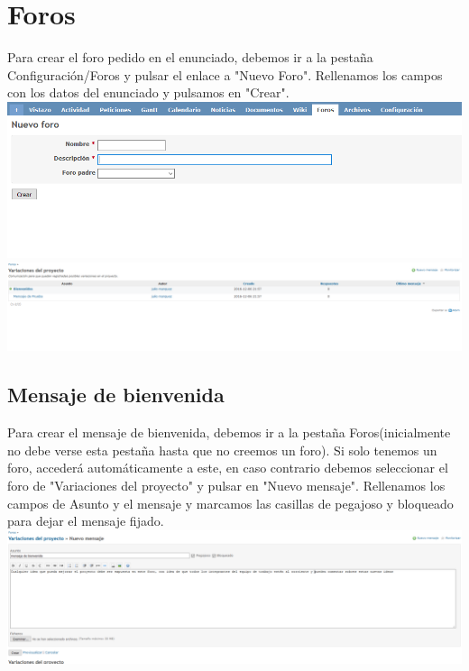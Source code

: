 \documentclass[a4paper,10pt]{scrartcl}
\begin{document}
\section{Foros}

Para crear el foro pedido en el enunciado, debemos ir a la pestaña Configuración/Foros y pulsar el enlace a "Nuevo Foro". Rellenamos los campos con los datos del enunciado y pulsamos en "Crear".\\

\includegraphics[width=15cm]{NuevoForo}\\

\includegraphics[width=15cm]{Foros} \\

\subsection{Mensaje de bienvenida}

Para crear el mensaje de bienvenida, debemos ir a la pestaña Foros(inicialmente no debe verse esta pestaña hasta que no creemos un foro). Si solo tenemos un foro, accederá automáticamente a este, en caso contrario debemos seleccionar el foro de "Variaciones del proyecto" y pulsar en "Nuevo mensaje". Rellenamos los campos de Asunto y el mensaje y marcamos las casillas de pegajoso y bloqueado para dejar el mensaje fijado.\\

\includegraphics[width=15cm]{NuevoMensaje}
\end{document}
